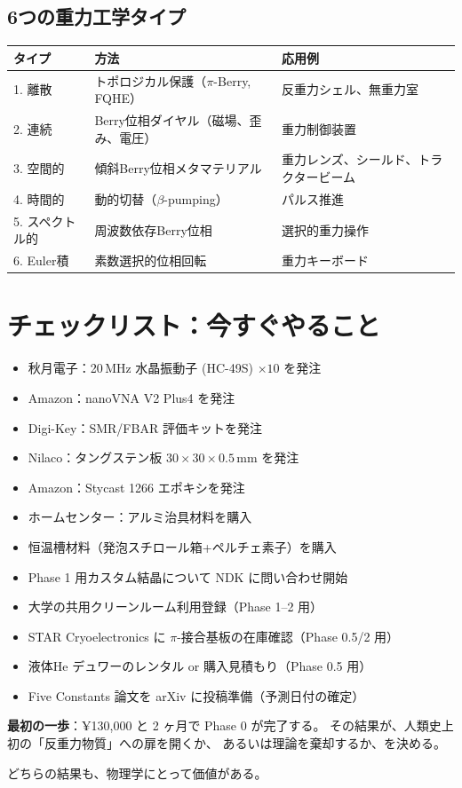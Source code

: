 \documentclass[11pt,a4paper]{article}
\begin{document}
\subsection{6つの重力工学タイプ}

\begin{center}
\begin{tabular}{llp{6cm}}
\toprule
タイプ & 方法 & 応用例 \\
\midrule
1. 離散 & トポロジカル保護（$\pi$-Berry, FQHE） & 反重力シェル、無重力室 \\
2. 連続 & Berry位相ダイヤル（磁場、歪み、電圧） & 重力制御装置 \\
3. 空間的 & 傾斜Berry位相メタマテリアル & 重力レンズ、シールド、トラクタービーム \\
4. 時間的 & 動的切替（$\beta$-pumping） & パルス推進 \\
5. スペクトル的 & 周波数依存Berry位相 & 選択的重力操作 \\
6. Euler積 & 素数選択的位相回転 & 重力キーボード \\
\bottomrule
\end{tabular}
\end{center}

\section{チェックリスト：今すぐやること}

\begin{itemize}
\item[$\square$] 秋月電子：20\,MHz 水晶振動子 (HC-49S) $\times 10$ を発注
\item[$\square$] Amazon：nanoVNA V2 Plus4 を発注
\item[$\square$] Digi-Key：SMR/FBAR 評価キットを発注
\item[$\square$] Nilaco：タングステン板 $30\times30\times0.5$\,mm を発注
\item[$\square$] Amazon：Stycast 1266 エポキシを発注
\item[$\square$] ホームセンター：アルミ治具材料を購入
\item[$\square$] 恒温槽材料（発泡スチロール箱+ペルチェ素子）を購入
\item[$\square$] Phase 1 用カスタム結晶について NDK に問い合わせ開始
\item[$\square$] 大学の共用クリーンルーム利用登録（Phase 1--2 用）
\item[$\square$] STAR Cryoelectronics に $\pi$-接合基板の在庫確認（Phase 0.5/2 用）
\item[$\square$] 液体He デュワーのレンタル or 購入見積もり（Phase 0.5 用）
\item[$\square$] Five Constants 論文を arXiv に投稿準備（予測日付の確定）
\end{itemize}

\vspace{1em}
\begin{tcolorbox}[colback=green!5,colframe=green!60!black]
\textbf{最初の一歩}：¥130,000 と 2 ヶ月で Phase 0 が完了する。
その結果が、人類史上初の「反重力物質」への扉を開くか、
あるいは理論を棄却するか、を決める。

どちらの結果も、物理学にとって価値がある。
\end{tcolorbox}
\end{document}
